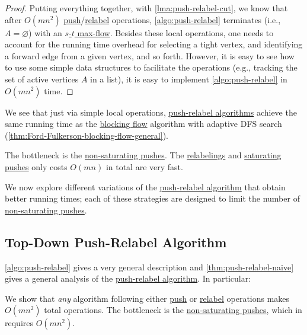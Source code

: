 \begin{proof}
	Putting everything together, with \autoref{lma:push-relabel-cut}, we know that after \(O(mn^2)\) \hyperref[algo:push-relabel-push]{push}/\hyperref[algo:push-relabel-relabel]{relabel} operations, \autoref{algo:push-relabel} terminates (i.e., \(A = \varnothing \)) with an \hyperref[prb:s-t-max-flow]{\(s\)-\(t\) max-flow}. Besides these local operations, one needs to account for the running time overhead for selecting a tight vertex, and identifying a forward edge from a given vertex, and so forth. However, it is easy to see how to use some simple data structures to facilitate the operations (e.g., tracking the set of active vertices \(A\) in a list), it is easy to implement \autoref{algo:push-relabel} in \(O(mn^2)\) time.
\end{proof}

We see that just via simple local operations, \hyperref[algo:push-relabel]{push-relabel algorithms} achieve the same running time as the \hyperref[def:blocking-flow]{blocking flow} algorithm with adaptive DFS search (\autoref{thm:Ford-Fulkerson-blocking-flow-general}).

\begin{remark}
	The bottleneck is the \hyperref[algo:push-relabel-push-non-saturating]{non-saturating pushes}. The \hyperref[algo:push-relabel-relabel]{relabelings} and \hyperref[algo:push-relabel-push-saturating]{saturating pushes} only costs \(O(mn)\) in total are very fast.
\end{remark}

We now explore different variations of the \hyperref[algo:push-relabel]{push-relabel algorithm} that obtain better running times; each of these strategies are designed to limit the number of \hyperref[algo:push-relabel-push-non-saturating]{non-saturating pushes}.

\subsection{Top-Down Push-Relabel Algorithm}
\autoref{algo:push-relabel} gives a very general description and \autoref{thm:push-relabel-naive} gives a general analysis of the \hyperref[algo:push-relabel]{push-relabel algorithm}. In particular:

\begin{prev}
	We show that \emph{any} algorithm following either \hyperref[algo:push-relabel-push]{push} or \hyperref[algo:push-relabel-relabel]{relabel} operations makes \(O(mn^2)\) total operations. The bottleneck is the \hyperref[algo:push-relabel-push-non-saturating]{non-saturating pushes}, which in requires \(O(mn^2)\).
\end{prev}

